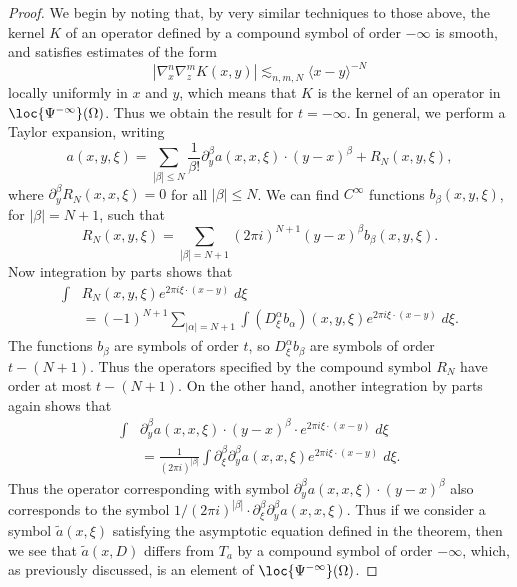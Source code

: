 \begin{proof}
    We begin by noting that, by very similar techniques to those above, the kernel $K$ of an operator defined by a compound symbol of order $-\infty$ is smooth, and satisfies estimates of the form
    \[ |\nabla^n_x \nabla^m_z K(x,y)| \lesssim_{n,m,N} \langle x - y \rangle^{-N} \]
    locally uniformly in $x$ and $y$, which means that $K$ is the kernel of an operator in $\loc{\Psi^{-\infty}}(\Omega)$. Thus we obtain the result for $t = -\infty$. In general, we perform a Taylor expansion, writing
    \[ a(x,y,\xi) = \sum_{|\beta| \leq N} \frac{1}{\beta !} \partial^\beta_y a(x,x,\xi) \cdot (y - x)^\beta + R_N(x,y,\xi), \]
    where $\partial^\beta_y R_N(x,x,\xi) = 0$ for all $|\beta| \leq N$. We can find $C^\infty$ functions $b_\beta(x,y,\xi)$, for $|\beta| = N+1$, such that
    \[ R_N(x,y,\xi) = \sum_{|\beta| = N+1} (2\pi i)^{N+1} (y - x)^\beta b_\beta(x,y,\xi). \]
    Now integration by parts shows that
    \begin{align*}
        \int & R_N(x,y,\xi) e^{2 \pi i \xi \cdot (x - y)}\; d\xi\\
        &= (-1)^{N+1} \sum_{|\alpha| = N+1} \int (D_\xi^\alpha b_\alpha)(x,y,\xi) e^{2 \pi i \xi \cdot (x - y)}\; d\xi.
    \end{align*}
    The functions $b_\beta$ are symbols of order $t$, so $D_\xi^\alpha b_\beta$ are symbols of order $t - (N+1)$. Thus the operators specified by the compound symbol $R_N$ have order at most $t - (N+1)$. On the other hand, another integration by parts again shows that
    \begin{align*}
        \int &\partial^\beta_y a(x,x,\xi) \cdot (y - x)^\beta \cdot e^{2 \pi i \xi \cdot (x - y)}\; d\xi\\
        &= \frac{1}{(2 \pi i)^{|\beta|}} \int \partial^\beta_\xi \partial^\beta_y a(x,x,\xi) e^{2 \pi i \xi \cdot (x - y)}\; d\xi.
    \end{align*}
    Thus the operator corresponding with symbol $\partial^\beta_y a(x,x,\xi) \cdot (y - x)^\beta$ also corresponds to the symbol $1 / (2 \pi i)^{|\beta|} \cdot \partial^\beta_\xi \partial^\beta_y a(x,x,\xi)$. Thus if we consider a symbol $\tilde{a}(x,\xi)$ satisfying the asymptotic equation defined in the theorem, then we see that $\tilde{a}(x,D)$ differs from $T_a$ by a compound symbol of order $-\infty$, which, as previously discussed, is an element of $\loc{\Psi^{-\infty}}(\Omega)$.
\end{proof}

